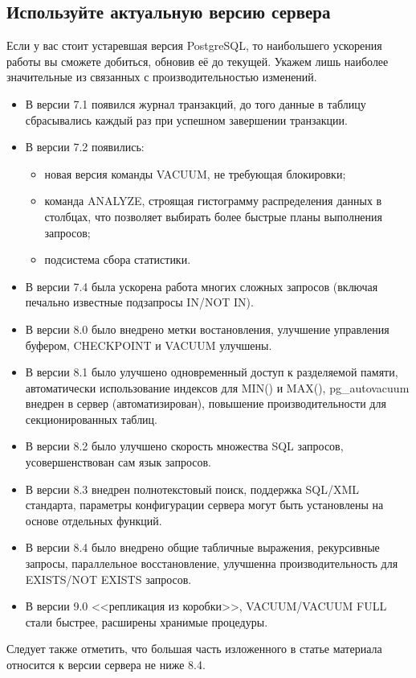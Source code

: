 \subsection{Используйте актуальную версию сервера}
Если у вас стоит устаревшая версия PostgreSQL, то наибольшего ускорения работы вы сможете 
добиться, обновив её до текущей. Укажем лишь наиболее значительные из связанных с производительностью изменений.
\begin{itemize}
\item В версии 7.1 появился журнал транзакций, до того данные в таблицу сбрасывались каждый раз при успешном завершении транзакции.
\item В версии 7.2 появились:
\begin{itemize}
\item новая версия команды VACUUM, не требующая блокировки;
\item команда ANALYZE, строящая гистограмму распределения данных в столбцах, что позволяет выбирать более 
быстрые планы выполнения запросов;
\item подсистема сбора статистики.
\end{itemize}
\item В версии 7.4 была ускорена работа многих сложных запросов (включая печально известные подзапросы IN/NOT IN).
\item В версии 8.0 было внедрено метки востановления, улучшение управления буфером, CHECKPOINT и VACUUM улучшены.
\item В версии 8.1 было улучшено одновременный доступ к разделяемой памяти, автоматически использование индексов для MIN() и MAX(),
pg\_autovacuum внедрен в сервер (автоматизирован), повышение производительности для секционированных таблиц.
\item В версии 8.2 было улучшено скорость множества SQL запросов, усовершенствован сам язык запросов. 
\item В версии 8.3 внедрен полнотекстовый поиск, поддержка SQL/XML стандарта, параметры конфигурации сервера могут быть 
установлены на основе отдельных функций.
\item В версии 8.4 было внедрено общие табличные выражения, рекурсивные запросы, параллельное восстановление, улучшенна 
производительность для EXISTS/NOT EXISTS запросов.
\item В версии 9.0 <<репликация из коробки>>, VACUUM/VACUUM FULL стали быстрее, расширены хранимые процедуры.
\end{itemize}
Следует также отметить, что большая часть изложенного в статье материала относится к версии сервера не ниже 8.4.

